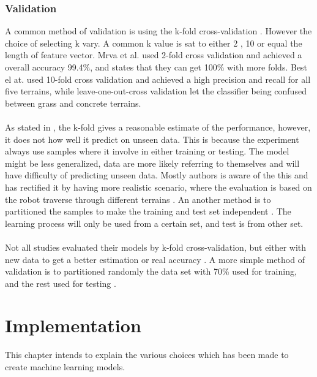 \documentclass[USenglish]{ifimaster}  %
\begin{document}
\subsection{Validation}\label{subseq:validation}
A common method of validation is using the k-fold cross-validation \cite{DBLP:conf/itat/MrvaF15,6784609,6386243,Hoffmann20141790,6849778,7387710}. However the choice of selecting k vary. A common k value is sat to either 2 \cite{DBLP:conf/itat/MrvaF15,6784609}, 10 \cite{26b23e912c654fe4b7478fd910130195,6386243,Hoffmann20141790,6849778,7387710} or equal the length of feature vector\cite{26b23e912c654fe4b7478fd910130195}.
Mrva et al. \cite{DBLP:conf/itat/MrvaF15} used 2-fold cross validation and achieved a overall accuracy 99.4\%, and states that they can get 100\% with more folds. Best el at. \cite{26b23e912c654fe4b7478fd910130195} used 10-fold cross validation and achieved a high precision and recall for all five terrains, while leave-one-out-cross validation let the classifier being confused between grass and concrete terrains. 
\\
\\
As stated in \cite{7387710}, the k-fold gives a reasonable estimate of the performance, however, it does not how well it predict on unseen data. This is because the experiment always use samples where it involve in either training or testing. The model might be less generalized, data are more likely referring to themselves and will have difficulty of predicting unseen data. Mostly authors is aware of the this and has rectified it by having more realistic scenario, where the evaluation is based on the robot traverse through different terrains \cite{DBLP:conf/itat/MrvaF15}. An another method is to partitioned the samples to make the training and test set independent \cite{26b23e912c654fe4b7478fd910130195}. The learning process will only be used from a certain set, and test is from other set. 
\\
\\
Not all studies evaluated their models by k-fold cross-validation, but either with new data to get a better estimation or real accuracy \cite{5509309,Walas2015,5752869}. A more simple method of validation is to partitioned randomly the data set with 70\% used for training, and the rest used for testing \cite{5752869}.  



\chapter{Implementation}        %
This chapter intends to explain the various choices which has been made to create machine learning models.
\end{document}
